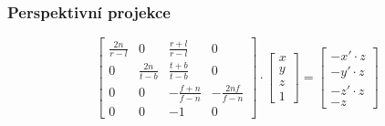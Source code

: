 \begin{frame}
\frametitle{Perspektivní projekce}
{\tiny
\begin{equation}
\left[
\begin{array}{cccc} 
\frac{2n}{r-l} & 0               & \frac{r+l}{r-l} & 0 \\
0               & \frac{2n}{t-b} & \frac{t+b}{t-b} & 0 \\
0               & 0               & -\frac{f+n}{f-n} & -\frac{2nf}{f-n} \\
0               & 0               & -1                & 0
\end{array}
\right]
\cdot
\left[
\begin{array}{c}
x \\
y \\
z \\
1
\end{array}
\right]
=
\left[
\begin{array}{c}
-x'\cdot z \\
-y'\cdot z \\
-z'\cdot z \\
-z
\end{array}
\right]
\end{equation}
}
\end{frame}


